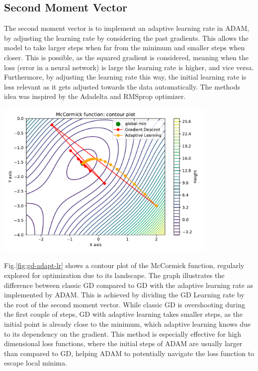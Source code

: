 \documentclass[oneside]{article}
\begin{document}
\subsection{Second Moment Vector}
The second moment vector is to implement an adaptive learning rate in ADAM, by adjusting the learning rate by considering the past gradients. This allows the model to take larger steps when far from the minimum and smaller steps when closer. This is possible, as the squared gradient is considered, meaning when the loss (error in a neural network) is large the learning rate is higher, and vice versa. Furthermore, by adjusting the learning rate this way, the initial learning rate is less relevant as it gets adjusted towards the data automatically. The methods idea was inspired by the Adadelta and RMSprop optimizer.\par
\begin{center}
    \includegraphics[width=0.8\textwidth]{report/figures/GD_rmsprop.pdf}
    \label{fig:gd-adapt-lr}
\end{center}\par
Fig.\ref{fig:gd-adapt-lr} shows a contour plot of the McCormick function, regularly explored for optimization due to its landscape. The graph illustrates the difference between classic GD compared to GD with the adaptive learning rate as implemented by ADAM. This is achieved by dividing the GD Learning rate by the root of the second moment vector. While classic GD is overshooting during the first couple of steps, GD with adaptive learning takes smaller steps, as the initial point is already close to the minimum, which adaptive learning knows due to its dependency on the gradient. This method is especially effective for high dimensional loss functions, where the initial steps of ADAM are usually larger than compared to GD, helping ADAM to potentially navigate the loss function to escape local minima.\par
\end{document}

